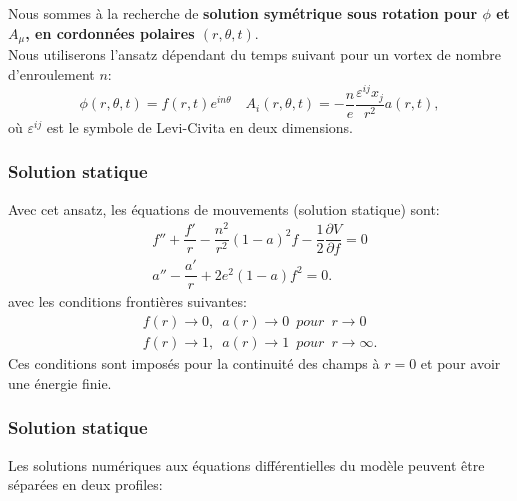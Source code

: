 \documentclass{beamer}
\begin{document}
\begin{frame}
Nous sommes à la recherche de \textbf{solution symétrique sous rotation pour $\phi$ et $A_\mu$, en cordonnées polaires $(r,\theta,t)$}. \\
Nous utiliserons l'ansatz dépendant du temps suivant pour un vortex de nombre d'enroulement $n$:
\begin{equation*}
\phi(r,\theta,t)=f(r,t)e^{in\theta} \quad  A_i (r,\theta,t) = -\frac{n}{e} \frac{\varepsilon^{ij} x_j}{r^2} a(r,t) ,
\end{equation*}
où $\varepsilon^{ij}$ est le symbole de Levi-Civita en deux dimensions.
\end{frame}


\begin{frame}
\frametitle{Solution statique}
Avec cet ansatz, les équations de mouvements (solution statique) sont:
\begin{equation*}
\begin{array}{l}
f''+\dfrac{f'}{r}-\dfrac{n^2}{r^2}(1-a)^2 f-\dfrac{1}{2}\dfrac{\partial V}{\partial f}=0\\
a''-\dfrac{a'}{r}+2e^2 (1-a)f^2 =0 .
\end{array}
\end{equation*} 
avec les conditions frontières suivantes:
\begin{equation*}
\begin{array}{l}
f(r)\to 0, \; \: a(r)\to 0 \; \: pour \; \: r\to 0\\
f(r)\to 1, \; \: a(r)\to 1 \; \: pour \; \: r\to \infty .
\end{array}
\end{equation*} 
Ces conditions sont imposés pour la continuité des champs à $r=0$ et pour avoir une énergie finie. 
\end{frame}




\begin{frame}
\frametitle{Solution statique}
Les solutions numériques aux équations différentielles du modèle peuvent être séparées en deux profiles:
\end{frame}
\end{document}
